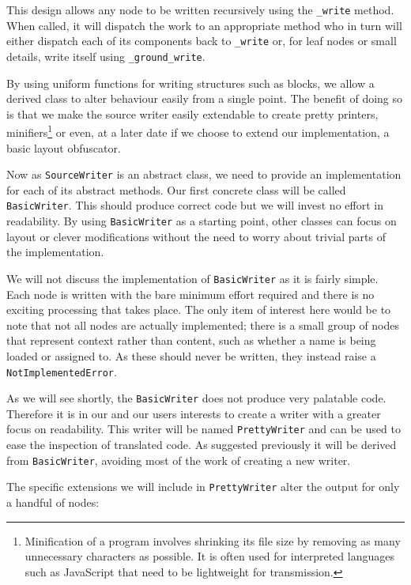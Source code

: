 \documentclass[twoside,a4paper]{report}
\begin{document}
This design allows any node to be written recursively using the \texttt{\_write} method. When called, it will dispatch the work to an appropriate method who
in turn will either dispatch each of its components back to \texttt{\_write} or, for leaf nodes or small details, write itself using
\texttt{\_ground\_write}.

By using uniform functions for writing structures such as blocks, we allow a derived class to alter behaviour easily from
a single point. The benefit of doing so is that we make the source writer easily extendable to create pretty printers,
minifiers\footnote{Minification of a program involves shrinking its file size by removing as many unnecessary characters as possible. It is
often used for interpreted languages such as JavaScript that need to be lightweight for transmission.} or even, at a later date if we choose
to extend our implementation, a basic layout obfuscator.

Now as \texttt{SourceWriter} is an abstract class, we need to provide an implementation for each of its abstract methods. Our first concrete class
will be called \texttt{BasicWriter}. This should produce correct code but we will invest no effort in readability. By using \texttt{BasicWriter} as
a starting point, other classes can focus on layout or clever modifications without the need to worry about trivial parts of the implementation.

We will not discuss the implementation of \texttt{BasicWriter} as it is fairly simple. Each node is written with the bare minimum effort required
and there is no exciting processing that takes place. The only item of interest here would be to note that not all nodes are actually implemented;
there is a small group of nodes that represent context rather than content, such as whether a name is being loaded or assigned to. As these should
never be written, they instead raise a \texttt{NotImplementedError}.

As we will see shortly, the \texttt{BasicWriter} does not produce very palatable code. Therefore it is in our and our users interests to
create a writer with a greater focus on readability. This writer will be named \texttt{PrettyWriter} and can be used to ease the inspection of
translated code. As suggested previously it will be derived from \texttt{BasicWriter}, avoiding most of the work of creating a new writer.

The specific extensions we will include in \texttt{PrettyWriter} alter the output for only a handful of nodes:
\end{document}
